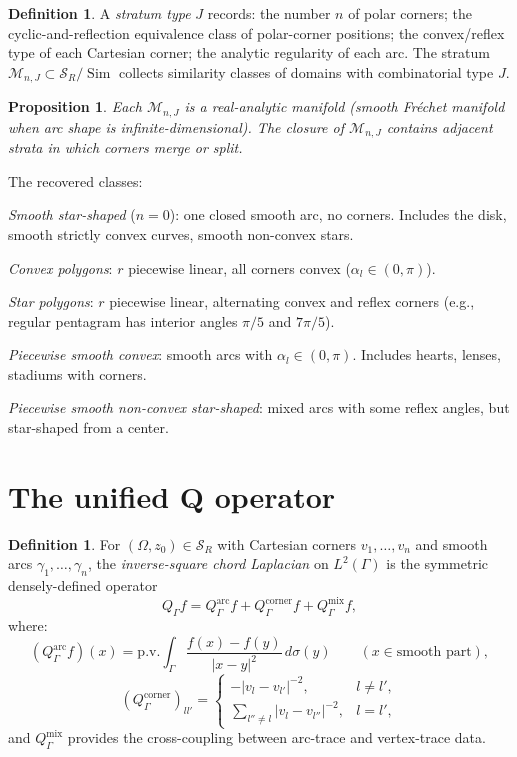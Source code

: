 \documentclass[11pt,reqno]{amsart}
\theoremstyle{plain}
\newtheorem{proposition}[theorem]{Proposition}
\theoremstyle{definition}
\newtheorem{definition}[theorem]{Definition}
\theoremstyle{remark}
\DeclareMathOperator{\Sim}{Sim}
\newcommand{\Scal}{\mathcal{S}}
\newcommand{\Mcal}{\mathcal{M}}
\newcommand{\Qop}{Q}
\begin{document}
\begin{definition}\label{def:strata}
A \emph{stratum type} $J$ records: the number $n$ of polar corners; the cyclic-and-reflection equivalence class of polar-corner positions; the convex/reflex type of each Cartesian corner; the analytic regularity of each arc. The stratum $\Mcal_{n,J} \subset \Scal_R/\Sim$ collects similarity classes of domains with combinatorial type $J$.
\end{definition}

\begin{proposition}\label{prop:strata-manifold}
Each $\Mcal_{n,J}$ is a real-analytic manifold (smooth Fréchet manifold when arc shape is infinite-dimensional). The closure of $\Mcal_{n,J}$ contains adjacent strata in which corners merge or split.
\end{proposition}

The recovered classes:

\emph{Smooth star-shaped} ($n = 0$): one closed smooth arc, no corners. Includes the disk, smooth strictly convex curves, smooth non-convex stars.

\emph{Convex polygons}: $r$ piecewise linear, all corners convex ($\alpha_l \in (0, \pi)$).

\emph{Star polygons}: $r$ piecewise linear, alternating convex and reflex corners (e.g., regular pentagram has interior angles $\pi/5$ and $7\pi/5$).

\emph{Piecewise smooth convex}: smooth arcs with $\alpha_l \in (0, \pi)$. Includes hearts, lenses, stadiums with corners.

\emph{Piecewise smooth non-convex star-shaped}: mixed arcs with some reflex angles, but star-shaped from a center.

\section{The unified Q operator}\label{sec:Q-operator}

\begin{definition}\label{def:Q-unified}
For $(\Omega, z_0) \in \Scal_R$ with Cartesian corners $v_1, \dots, v_n$ and smooth arcs $\gamma_1, \dots, \gamma_n$, the \emph{inverse-square chord Laplacian} on $L^2(\Gamma)$ is the symmetric densely-defined operator
\[
\Qop_\Gamma f = \Qop_\Gamma^{\mathrm{arc}} f + \Qop_\Gamma^{\mathrm{corner}} f + \Qop_\Gamma^{\mathrm{mix}} f,
\]
where:
\[
(\Qop_\Gamma^{\mathrm{arc}} f)(x) = \mathrm{p.v.}\int_\Gamma \frac{f(x)-f(y)}{|x-y|^2}\, d\sigma(y) \qquad (x \in \text{smooth part}),
\]
\[
(\Qop_\Gamma^{\mathrm{corner}})_{ll'} = \begin{cases} -|v_l - v_{l'}|^{-2}, & l \neq l', \\ \sum_{l''\neq l}|v_l - v_{l''}|^{-2}, & l = l', \end{cases}
\]
and $\Qop_\Gamma^{\mathrm{mix}}$ provides the cross-coupling between arc-trace and vertex-trace data.
\end{definition}
\end{document}
